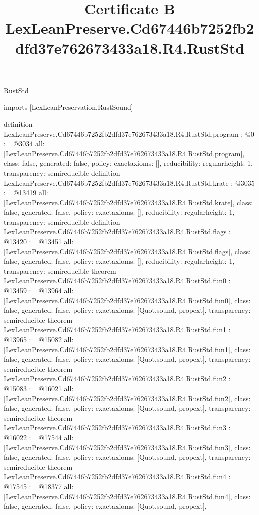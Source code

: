 \begin{lexlean}{RustStd}
\title{Certificate B LexLeanPreserve.Cd67446b7252fb2dfd37e762673433a18.R4.RustStd}
\begin{coremodule}
imports [LexLeanPreservation.RustSound]

definition LexLeanPreserve.Cd67446b7252fb2dfd37e762673433a18.R4.RustStd.program : @0 := @3034 {
  all: [LexLeanPreserve.Cd67446b7252fb2dfd37e762673433a18.R4.RustStd.program],
  class: false,
  generated: false,
  policy: exact{axioms: []},
  reducibility: regular{height: 1},
  transparency: semireducible
}
definition LexLeanPreserve.Cd67446b7252fb2dfd37e762673433a18.R4.RustStd.krate : @3035 := @13419 {
  all: [LexLeanPreserve.Cd67446b7252fb2dfd37e762673433a18.R4.RustStd.krate],
  class: false,
  generated: false,
  policy: exact{axioms: []},
  reducibility: regular{height: 1},
  transparency: semireducible
}
definition LexLeanPreserve.Cd67446b7252fb2dfd37e762673433a18.R4.RustStd.flags : @13420 := @13451 {
  all: [LexLeanPreserve.Cd67446b7252fb2dfd37e762673433a18.R4.RustStd.flags],
  class: false,
  generated: false,
  policy: exact{axioms: []},
  reducibility: regular{height: 1},
  transparency: semireducible
}
theorem LexLeanPreserve.Cd67446b7252fb2dfd37e762673433a18.R4.RustStd.fun0 : @13459 := @13964 {
  all: [LexLeanPreserve.Cd67446b7252fb2dfd37e762673433a18.R4.RustStd.fun0],
  class: false,
  generated: false,
  policy: exact{axioms: [Quot.sound, propext]},
  transparency: semireducible
}
theorem LexLeanPreserve.Cd67446b7252fb2dfd37e762673433a18.R4.RustStd.fun1 : @13965 := @15082 {
  all: [LexLeanPreserve.Cd67446b7252fb2dfd37e762673433a18.R4.RustStd.fun1],
  class: false,
  generated: false,
  policy: exact{axioms: [Quot.sound, propext]},
  transparency: semireducible
}
theorem LexLeanPreserve.Cd67446b7252fb2dfd37e762673433a18.R4.RustStd.fun2 : @15083 := @16021 {
  all: [LexLeanPreserve.Cd67446b7252fb2dfd37e762673433a18.R4.RustStd.fun2],
  class: false,
  generated: false,
  policy: exact{axioms: [Quot.sound, propext]},
  transparency: semireducible
}
theorem LexLeanPreserve.Cd67446b7252fb2dfd37e762673433a18.R4.RustStd.fun3 : @16022 := @17544 {
  all: [LexLeanPreserve.Cd67446b7252fb2dfd37e762673433a18.R4.RustStd.fun3],
  class: false,
  generated: false,
  policy: exact{axioms: [Quot.sound, propext]},
  transparency: semireducible
}
theorem LexLeanPreserve.Cd67446b7252fb2dfd37e762673433a18.R4.RustStd.fun4 : @17545 := @18377 {
  all: [LexLeanPreserve.Cd67446b7252fb2dfd37e762673433a18.R4.RustStd.fun4],
  class: false,
  generated: false,
  policy: exact{axioms: [Quot.sound, propext]},
}
\end{coremodule}
\end{lexlean}
